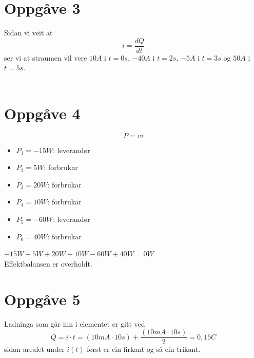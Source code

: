 \documentclass[12pt,a4paper]{article}
\begin{document}
  \section{Oppgåve 3}
    Sidan vi veit at
    \begin{equation}
      i = \frac{dQ}{dt}
    \end{equation}
    ser vi at straumen vil vere $10A$ i $t=0s$, $-40A$ i $t=2s$, $-5A$ i $t=3s$ og
    $50A$ i $t=5s$. \\ \\

  \newpage
  
  \section{Oppgåve 4}
    \begin{equation}
      P = vi
    \end{equation}
    \begin{itemize}
      \item $P_{1} = -15W$: leverandør
      \item $P_{2} = 5W$: forbrukar
      \item $P_{3} = 20W$: forbrukar
      \item $P_{4} = 10W$: forbrukar
      \item $P_{5} = -60W$: leverandør
      \item $P_{6} = 40W$: forbrukar
    \end{itemize}
    $-15W + 5W + 20W +10W - 60W + 40W = 0W$ \\
    Effektbalansen er overholdt.
  
  \section{Oppgåve 5}
    Ladninga som går inn i elementet er gitt ved
    \begin{equation}
      Q=i\cdot t = (10mA \cdot 10s) + \frac{(10mA \cdot 10s)}{2} = 0,15C
    \end{equation}
    sidan arealet under $i(t)$ først er ein firkant og så ein trikant.
\end{document}
